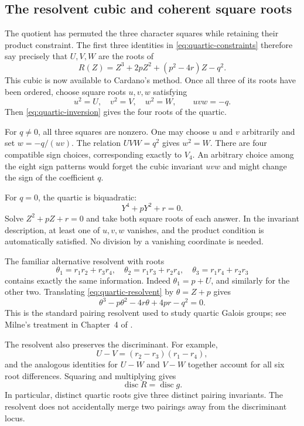 \documentclass[11pt]{article}
\theoremstyle{remark}
\begin{document}
\subsection{The resolvent cubic and coherent square roots}

The quotient has permuted the three character squares while retaining their product constraint. The first three identities in \eqref{eq:quartic-constraints} therefore say precisely that \(U,V,W\) are the roots of
\begin{equation}
R(Z)=Z^3+2pZ^2+(p^2-4r)Z-q^2.
\label{eq:quartic-resolvent}
\end{equation}
This cubic is now available to Cardano's method. Once all three of its roots have been ordered, choose square roots \(u,v,w\) satisfying
\begin{equation}
u^2=U,\quad v^2=V,\quad w^2=W,\qquad uvw=-q.
\label{eq:quartic-signs}
\end{equation}
Then \eqref{eq:quartic-inversion} gives the four roots of the quartic.

For \(q\ne0\), all three squares are nonzero. One may choose \(u\) and \(v\) arbitrarily and set \(w=-q/(uv)\). The relation \(UVW=q^2\) gives \(w^2=W\). There are four compatible sign choices, corresponding exactly to \(V_4\). An arbitrary choice among the eight sign patterns would forget the cubic invariant \(uvw\) and might change the sign of the coefficient \(q\).

For \(q=0\), the quartic is biquadratic:
\[
Y^4+pY^2+r=0.
\]
Solve \(Z^2+pZ+r=0\) and take both square roots of each answer. In the invariant description, at least one of \(u,v,w\) vanishes, and the product condition is automatically satisfied. No division by a vanishing coordinate is needed.

The familiar alternative resolvent with roots
\[
\theta_1=r_1r_2+r_3r_4,\quad
\theta_2=r_1r_3+r_2r_4,\quad
\theta_3=r_1r_4+r_2r_3
\]
contains exactly the same information. Indeed \(\theta_1=p+U\), and similarly for the other two. Translating \eqref{eq:quartic-resolvent} by \(\theta=Z+p\) gives
\begin{equation}
\theta^3-p\theta^2-4r\theta+4pr-q^2=0.
\label{eq:alternative-resolvent}
\end{equation}
This is the standard pairing resolvent used to study quartic Galois groups; see Milne's treatment in Chapter~4 of \cite{milne}.

The resolvent also preserves the discriminant. For example,
\[
U-V=(r_2-r_3)(r_1-r_4),
\]
and the analogous identities for \(U-W\) and \(V-W\) together account for all six root differences. Squaring and multiplying gives
\[
\operatorname{disc}R=\operatorname{disc}g.
\]
In particular, distinct quartic roots give three distinct pairing invariants. The resolvent does not accidentally merge two pairings away from the discriminant locus.
\end{document}
